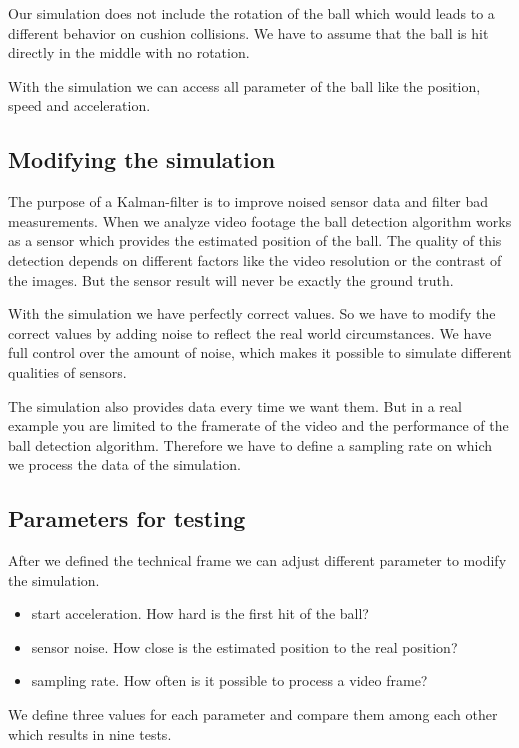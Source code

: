 \documentclass[12pt, letterpaper, twoside]{article}
\begin{document}
Our simulation does not include the rotation of the ball which would leads to a different behavior on cushion collisions.
We have to assume that the ball is hit directly in the middle with no rotation.

With the simulation we can access all parameter of the ball like the position, speed and acceleration.

\subsection{Modifying the simulation}

The purpose of a Kalman-filter is to improve noised sensor data and filter bad measurements.
When we analyze video footage the ball detection algorithm works as a sensor which provides the estimated position of the ball.
The quality of this detection depends on different factors like the video resolution or the contrast of the images.
But the sensor result will never be exactly the ground truth.

With the simulation we have perfectly correct values. So we have to modify the correct values by adding noise to reflect the real world circumstances.
We have full control over the amount of noise, which makes it possible to simulate different qualities of sensors.

The simulation also provides data every time we want them. But in a real example you are limited to the framerate of the video and the performance of the ball detection algorithm.
Therefore we have to define a sampling rate on which we process the data of the simulation. 

\subsection{Parameters for testing}

After we defined the technical frame we can adjust different parameter to modify the simulation.

\begin{itemize}
    \item start acceleration. How hard is the first hit of the ball?
    \item sensor noise. How close is the estimated position to the real position?
    \item sampling rate. How often is it possible to process a video frame?
\end{itemize}

We define three values for each parameter and compare them among each other which results in nine tests.
\end{document}
